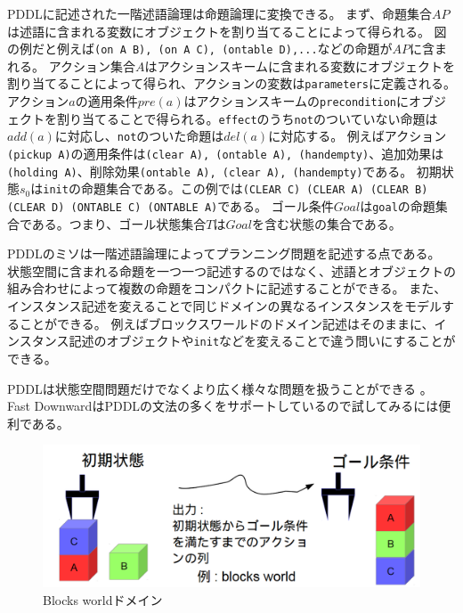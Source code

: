 PDDLに記述された一階述語論理は命題論理に変換できる。
まず、命題集合$AP$は述語に含まれる変数にオブジェクトを割り当てることによって得られる。
図の例だと例えば\texttt{(on A B), (on A C), (ontable D),...}などの命題が$AP$に含まれる。
アクション集合$A$はアクションスキームに含まれる変数にオブジェクトを割り当てることによって得られ、アクションの変数は\texttt{parameters}に定義される。
アクション$a$の適用条件$pre(a)$はアクションスキームの\texttt{precondition}にオブジェクトを割り当てることで得られる。\texttt{effect}のうち\texttt{not}のついていない命題は$add(a)$に対応し、\texttt{not}のついた命題は$del(a)$に対応する。
例えばアクション\texttt{(pickup A)}の適用条件は{\texttt{(clear A), (ontable A), (handempty)}}、追加効果は{\texttt{(holding A)}}、削除効果{\texttt{(ontable A), (clear A), (handempty)}}である。
初期状態$s_0$は\texttt{init}の命題集合である。この例では{\texttt{(CLEAR C) (CLEAR A) (CLEAR B) (CLEAR D) (ONTABLE C) (ONTABLE A)}}である。
ゴール条件$Goal$は\texttt{goal}の命題集合である。つまり、ゴール状態集合$T$は$Goal$を含む状態の集合である。

PDDLのミソは一階述語論理によってプランニング問題を記述する点である。
状態空間に含まれる命題を一つ一つ記述するのではなく、述語とオブジェクトの組み合わせによって複数の命題をコンパクトに記述することができる。
また、インスタンス記述を変えることで同じドメインの異なるインスタンスをモデルすることができる。
例えばブロックスワールドのドメイン記述はそのままに、インスタンス記述のオブジェクトや\texttt{init}などを変えることで違う問いにすることができる。

PDDLは状態空間問題だけでなくより広く様々な問題を扱うことができる \cite{aeronautiques1998pddl,fox2003pddl2}。
Fast DownwardはPDDLの文法の多くをサポートしているので試してみるには便利である。

\begin{figure}
\includegraphics[width=0.8\linewidth]{./figures/blocks-image.png}
\caption{Blocks worldドメイン}
\label{fig:sliding-token}
\end{figure}

